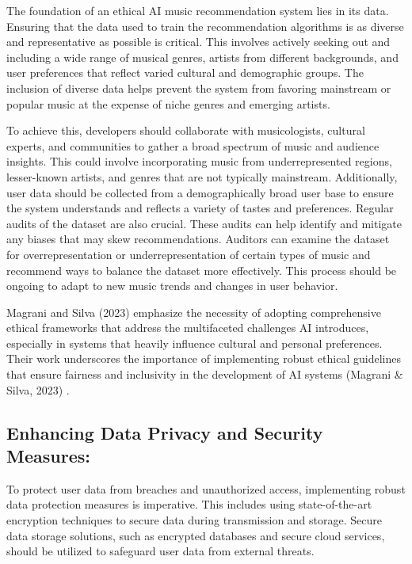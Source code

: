 \documentclass[10pt,twocolumn]{article}
\begin{document}
 The foundation of an ethical AI music recommendation system lies in its data. Ensuring that the data used to train the recommendation algorithms is as diverse and representative as possible is critical. This involves actively seeking out and including a wide range of musical genres, artists from different backgrounds, and user preferences that reflect varied cultural and demographic groups. The inclusion of diverse data helps prevent the system from favoring mainstream or popular music at the expense of niche genres and emerging artists.

To achieve this, developers should collaborate with musicologists, cultural experts, and communities to gather a broad spectrum of music and audience insights. This could involve incorporating music from underrepresented regions, lesser-known artists, and genres that are not typically mainstream. Additionally, user data should be collected from a demographically broad user base to ensure the system understands and reflects a variety of tastes and preferences. Regular audits of the dataset are also crucial. These audits can help identify and mitigate any biases that may skew recommendations. Auditors can examine the dataset for overrepresentation or underrepresentation of certain types of music and recommend ways to balance the dataset more effectively. This process should be ongoing to adapt to new music trends and changes in user behavior.

Magrani and Silva (2023)\cite{magrani2023ethical} emphasize the necessity of adopting comprehensive ethical frameworks that address the multifaceted challenges AI introduces, especially in systems that heavily influence cultural and personal preferences. Their work underscores the importance of implementing robust ethical guidelines that ensure fairness and inclusivity in the development of AI systems (Magrani & Silva, 2023) \cite{magrani2023ethical}.


\subsection{Enhancing Data Privacy and Security Measures: }

To protect user data from breaches and unauthorized access, implementing robust data protection measures is imperative. This includes using state-of-the-art encryption techniques to secure data during transmission and storage. Secure data storage solutions, such as encrypted databases and secure cloud services, should be utilized to safeguard user data from external threats.
\end{document}
